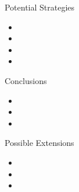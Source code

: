 \documentclass[final]{beamer}\usepackage[]{graphicx}\usepackage[]{color}
\newlength{\sepwid}
\newlength{\onecolwid}
\newlength{\twocolwid}
\begin{document}
\begin{frame}[t]
\begin{columns}[t]
\begin{column}{\twocolwid}
\begin{columns}[t,totalwidth=\twocolwid]
\end{columns} %

\end{column} %

\begin{column}{\sepwid}\end{column} %

\begin{column}{\onecolwid} %


\begin{block}{Potential Strategies}
\vspace{0ex}
\begin{itemize}
\item
\item
\item
\item
\end{itemize}
\vspace{0ex}
\vfill
\end{block}
\vfill


\begin{block}{Conclusions}
\begin{itemize}
\item
\item
\item
\end{itemize}
\vspace{0ex}
\vfill
\end{block}
\vfill
\begin{block}{Possible Extensions}
\begin{itemize}
\item  
\item  
\item  
\end{itemize}
\vspace{0ex}
\vfill
\end{block}
\vfill


\end{column}
\end{columns}
\end{frame}
\end{document}
